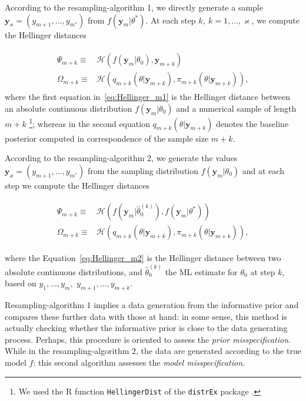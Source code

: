 \documentclass{statsoc}
\begin{document}
\begin{small}

 According to the resampling-algorithm 1, we directly generate a sample $\bm{y}_{\varkappa}=(y_{m+1},...,y_{m^{*}}) $ from $f(\bm{y}_{m}| \theta^{*})$. At each step $k, \ k=1, \ldots, \varkappa$, we compute the Hellinger distances 

\begin{align}
\begin{split}
\Psi_{m+k} \equiv & \mathcal{H}( f(\bm{y}_{m}|\theta_{0}),  \bm{y} _{m+k}  )  \\
\Omega_{m+k} \equiv &\mathcal{H}(q_{m+k}(\theta|\bm{y}_{m+k}), \pi_{m+k}(\theta|\bm{y}_{m+k})),
\end{split}
\label{eq:Hellinger_m1}
\end{align} 
where the first equation in~\eqref{eq:Hellinger_m1} is the Hellinger distance between an absolute continuous distribution $f(\bm{y}_{m}|\theta_{0})$ and a numerical sample of length $m+k$ \footnote{We used the R function {\tt{HellingerDist}} of the {\tt{distrEx}} package \citep{kohl2007distrex}.}; whereas in the second equation $ q_{m+k}(\theta|\bm{y}_{m+k})$ denotes the baseline posterior computed in correspondence of the sample size $m+k$. 

According to the resampling-algorithm 2, we generate the values $\bm{y}_{\varkappa}=(y_{m+1},...,y_{m^{*}}) $ from the  sampling distribution $f(\bm{y}_{m}| \theta_{0})$ and at each step we compute the Hellinger distances

\begin{align}
\begin{split}
\Psi_{m+k} \equiv & \mathcal{H}( f(\bm{y}_{m}|\hat{\theta}^{(k)}_{0}), f(\bm{y}_{m}| \theta^{*}) )\\
\Omega_{m+k} \equiv &\mathcal{H}(q_{m+k}(\theta|\bm{y}_{m+k}), \pi_{m+k}(\theta|\bm{y}_{m+k})),
\end{split}
\label{eq:Hellinger_m2}
\end{align} 

where the Equation~\eqref{eq:Hellinger_m2} is the Hellinger distance between two absolute continuous distributions, and $\hat{\theta}^{(k)}_{0}$ the ML estimate for $\theta_{0}$ at step $k$, based on $y_{1},\ldots,y_{m},$ $y_{m+1},\ldots,y_{m+k}$.

 Resampling-algorithm 1 implies a data generation from the informative prior and compares these further data with those at hand: in some sense, this method is actually checking whether the informative prior is close to the data generating process. Perhaps, this procedure is oriented to assess the \textit{prior misspecification}. While in the resampling-algorithm 2, the data are generated according to the true model $f$:  this second algorithm assesses the \textit{model misspecification}.




\end{small}
\end{document}
